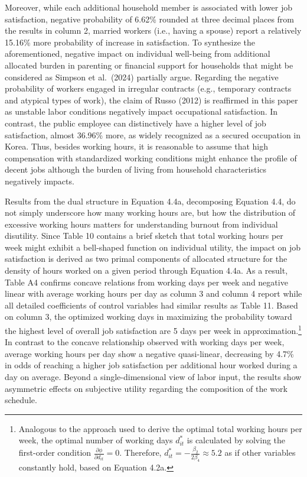 \documentclass[
  12pt,
]{article}
\begin{document}
Moreover, while each additional household member is associated with
lower job satisfaction, negative probability of 6.62\% rounded at three
decimal places from the results in column 2, married workers (i.e.,
having a spouse) report a relatively 15.16\% more probability of
increase in satisfaction. To synthesize the aforementioned, negative
impact on individual well-being from additional allocated burden in
parenting or financial support for households that might be considered
as Simpson et al.~(2024) partially argue. Regarding the negative
probability of workers engaged in irregular contracts (e.g., temporary
contracts and atypical types of work), the claim of Russo (2012) is
reaffirmed in this paper as unstable labor conditions negatively impact
occupational satisfaction. In contrast, the public employee can
distinctively have a higher level of job satisfaction, almost 36.96\%
more, as widely recognized as a secured occupation in Korea. Thus,
besides working hours, it is reasonable to assume that high compensation
with standardized working conditions might enhance the profile of decent
jobs although the burden of living from household characteristics
negatively impacts.

Results from the dual structure in Equation 4.4a, decomposing Equation
4.4, do not simply underscore how many working hours are, but how the
distribution of excessive working hours matters for understanding
burnout from individual disutility. Since Table 10 contains a brief
sketch that total working hours per week might exhibit a bell-shaped
function on individual utility, the impact on job satisfaction is
derived as two primal components of allocated structure for the density
of hours worked on a given period through Equation 4.4a. As a result,
Table A4 confirms concave relations from working days per week and
negative linear with average working hours per day as column 3 and
column 4 report while all detailed coefficients of control variables had
similar results as Table 11. Based on column 3, the optimized working
days in maximizing the probability toward the highest level of overall
job satisfaction are 5 days per week in approximation.\footnote{Analogous
  to the approach used to derive the optimal total working hours per
  week, the optimal number of working days \(d^*_{it}\) is calculated by
  solving the first-order condition
  \(\frac{\partial \phi}{\partial d_{it}}=0\). Therefore,
  \(d^*_{it} = - \frac{\beta_2}{2\beta_4} \approx 5.2\) as if other
  variables constantly hold, based on Equation 4.2a.} In contrast to the
concave relationship observed with working days per week, average
working hours per day show a negative quasi-linear, decreasing by 4.7\%
in odds of reaching a higher job satisfaction per additional hour worked
during a day on average. Beyond a single-dimensional view of labor
input, the results show asymmetric effects on subjective utility
regarding the composition of the work schedule.
\end{document}
